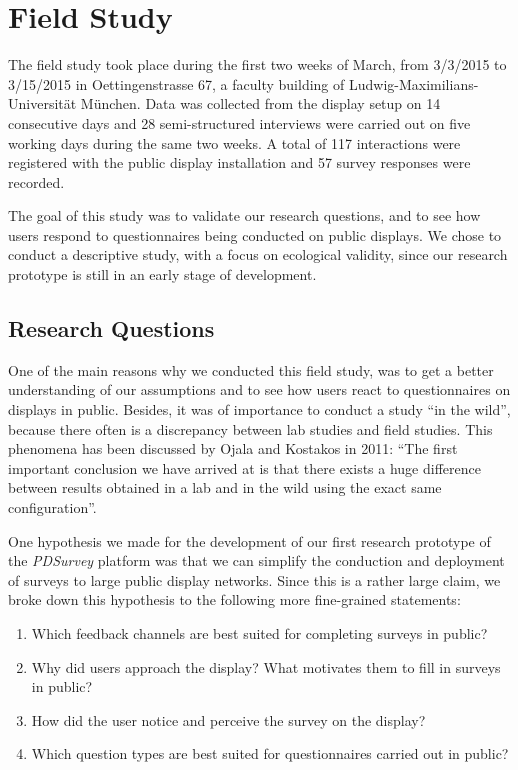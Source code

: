 \section{Field Study}
\label{chapter:field-study}


	The field study took place during the first two weeks of March, from 3/3/2015 to 3/15/2015 in Oettingenstrasse 67, a faculty building of Ludwig-Maximilians-Universit\"at M\"unchen. Data was collected from the display setup on 14 consecutive days and 28 semi-structured interviews were carried out on five working days during the same two weeks. A total of 117 interactions were registered with the public display installation and 57 survey responses were recorded.

	The goal of this study was to validate our research questions, and to see how users respond to questionnaires being conducted on public displays. We chose to conduct a descriptive study, with a focus on ecological validity, since our research prototype is still in an early stage of development. 




\subsection{Research Questions}

	One of the main reasons why we conducted this field study, was to get a better understanding of our assumptions and to see how users react to questionnaires on displays in public. Besides, it was of importance to conduct a study ``in the wild'', because there often is a discrepancy between lab studies and field studies. This phenomena has been discussed by Ojala and Kostakos in 2011: ``The first important conclusion we have arrived at is that there exists a huge difference between results obtained in a lab and in the wild using the exact same configuration''\cite{Ojala2011}.

	One hypothesis we made for the development of our first research prototype of the \textit{PDSurvey} platform was that we can simplify the conduction and deployment of surveys to large public display networks. Since this is a rather large claim, we broke down this hypothesis to the following more fine-grained statements:

	\begin{enumerate}
		\item Which feedback channels are best suited for completing surveys in public?
		\item Why did users approach the display? What motivates them to fill in surveys in public? 
		\item How did the user notice and perceive the survey on the display?
		\item Which question types are best suited for questionnaires carried out in public? 
	\end{enumerate}


